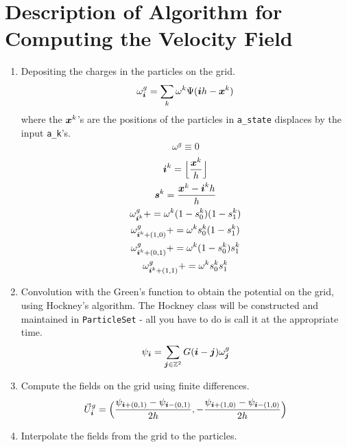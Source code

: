 \documentclass[11pt]{article}
\begin{document}
\section*{Description of Algorithm for Computing the Velocity Field}
\begin{enumerate}
    \item Depositing the charges in the particles on the grid.
          \begin{gather*}
              \omega^g_{\boldsymbol{i}} = \sum \limits_k \omega^k \Psi({\boldsymbol{i}} h - {\boldsymbol{x}}^k)
          \end{gather*}
          where the ${\boldsymbol{x}}^k$'s are the positions of the particles in {\tt a\_state} displaces by the input {\tt a\_k}'s.
          \begin{gather*}
              \omega^g \equiv 0
          \end{gather*}
          \begin{gather*}
              {\boldsymbol{i}}^k = \Big \lfloor \frac{{\boldsymbol{x}}^k}{h} \Big \rfloor \\
              {\boldsymbol{s}}^k =\frac{{\boldsymbol{x}}^k - {\boldsymbol{i}}^k h}{h}\\
              \omega^g_{{\boldsymbol{i}}^k} += \omega^k (1 - s^k_0)(1-s^k_1) \\
              \omega^g_{{\boldsymbol{i}}^k + (1,0)} += \omega^k s^k_0 (1 - s^k_1) \\
              \omega^g_{{\boldsymbol{i}}^k + (0,1)} += \omega^k (1 - s^k_0) s^k_1 \\
              \omega^g_{{\boldsymbol{i}}^k + (1,1)} += \omega^k s^k_0 s^k_1
          \end{gather*}
    \item Convolution with the Green's function to obtain the potential on the grid, using Hockney's algorithm. The Hockney class will be constructed and maintained in {\tt ParticleSet} - all you have to do is call it at the appropriate time.
          \begin{gather*}
              \psi_{\boldsymbol{i}} = \sum \limits_{{\boldsymbol{j}} \in \mathbb{Z}^2} G({\boldsymbol{i}} - {\boldsymbol{j}}) \omega^g_{\boldsymbol{j}}
          \end{gather*}
    \item Compute the fields on the grid using finite differences.
          \begin{gather*}
              \vec{U}^g_{\boldsymbol{i}} = \Big (\frac{\psi_{{\boldsymbol{i}} + (0,1)} - \psi_{{\boldsymbol{i}} - (0,1)}}{2 h} , -\frac{\psi_{{\boldsymbol{i}} + (1,0)} - \psi_{{\boldsymbol{i}} - (1,0)}}{2 h} \Big )
          \end{gather*}
    \item Interpolate the fields from the grid to the particles.

\end{enumerate}
\end{document}
